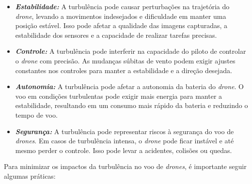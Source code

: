 \documentclass[a4paper, 12pt, onecolumn,singlespacing]{article}
\begin{document}
	\begin{itemize}
		\item \textbf{\textit{Estabilidade:}} A turbulência pode causar perturbações na trajetória do \textit{drone}, levando a movimentos indesejados e dificuldade em manter uma posição estável. Isso pode afetar a qualidade das imagens capturadas, a estabilidade dos sensores e a capacidade de realizar tarefas precisas.
		
		\item \textbf{\textit{Controle:}} A turbulência pode interferir na capacidade do piloto de controlar o \textit{drone} com precisão. As mudanças súbitas de vento podem exigir ajustes constantes nos controles para manter a estabilidade e a direção desejada.
		
		\item \textbf{\textit{Autonomia:}} A turbulência pode afetar a autonomia da bateria do \textit{drone}. O voo em condições turbulentas pode exigir mais energia para manter a estabilidade, resultando em um consumo mais rápido da bateria e reduzindo o tempo de voo.
		
		\item \textbf{\textit{Segurança:}} A turbulência pode representar riscos à segurança do voo de \textit{drones}. Em casos de turbulência intensa, o \textit{drone} pode ficar instável e até mesmo perder o controle. Isso pode levar a acidentes, colisões ou quedas.
	\end{itemize}
	
	
	Para minimizar os impactos da turbulência no voo de \textit{drones}, é importante seguir algumas práticas:
	
\end{document}
